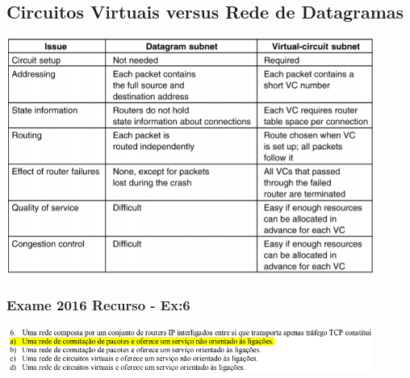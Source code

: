 \documentclass[../resumosRCOM.tex]{subfiles}
\begin{document}
\subsection{Circuitos Virtuais versus Rede de Datagramas}
\begin{center}            
    \includegraphics[width=12cm]{images/RCOM5.png}
\end{center}

\subsubsection{Exame 2016 Recurso - Ex:6}
\begin{center}            
    \includegraphics[width=12cm]{images/RCOM48.png}
\end{center}
\end{document}
